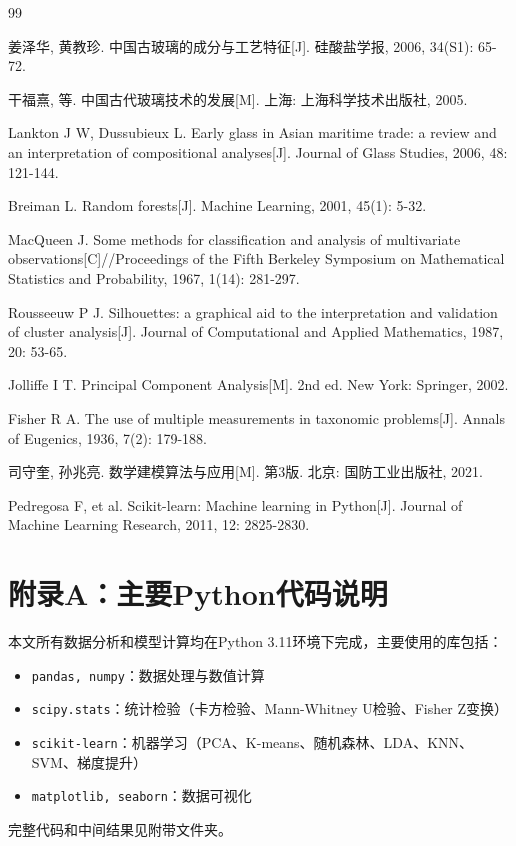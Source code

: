 \documentclass[12pt,a4paper]{ctexart}
\begin{document}
\begin{thebibliography}{99}

 姜泽华, 黄教珍. 中国古玻璃的成分与工艺特征[J]. 硅酸盐学报, 2006, 34(S1): 65-72.

 干福熹, 等. 中国古代玻璃技术的发展[M]. 上海: 上海科学技术出版社, 2005.

 Lankton J W, Dussubieux L. Early glass in Asian maritime trade: a review and an interpretation of compositional analyses[J]. Journal of Glass Studies, 2006, 48: 121-144.

 Breiman L. Random forests[J]. Machine Learning, 2001, 45(1): 5-32.

 MacQueen J. Some methods for classification and analysis of multivariate observations[C]//Proceedings of the Fifth Berkeley Symposium on Mathematical Statistics and Probability, 1967, 1(14): 281-297.

 Rousseeuw P J. Silhouettes: a graphical aid to the interpretation and validation of cluster analysis[J]. Journal of Computational and Applied Mathematics, 1987, 20: 53-65.

 Jolliffe I T. Principal Component Analysis[M]. 2nd ed. New York: Springer, 2002.

 Fisher R A. The use of multiple measurements in taxonomic problems[J]. Annals of Eugenics, 1936, 7(2): 179-188.

 司守奎, 孙兆亮. 数学建模算法与应用[M]. 第3版. 北京: 国防工业出版社, 2021.

 Pedregosa F, et al. Scikit-learn: Machine learning in Python[J]. Journal of Machine Learning Research, 2011, 12: 2825-2830.

\end{thebibliography}

\newpage
\section*{附录A：主要Python代码说明}

本文所有数据分析和模型计算均在Python 3.11环境下完成，主要使用的库包括：
\begin{itemize}
    \item \texttt{pandas, numpy}：数据处理与数值计算
    \item \texttt{scipy.stats}：统计检验（卡方检验、Mann-Whitney U检验、Fisher Z变换）
    \item \texttt{scikit-learn}：机器学习（PCA、K-means、随机森林、LDA、KNN、SVM、梯度提升）
    \item \texttt{matplotlib, seaborn}：数据可视化
\end{itemize}

完整代码和中间结果见附带文件夹。
\end{document}

